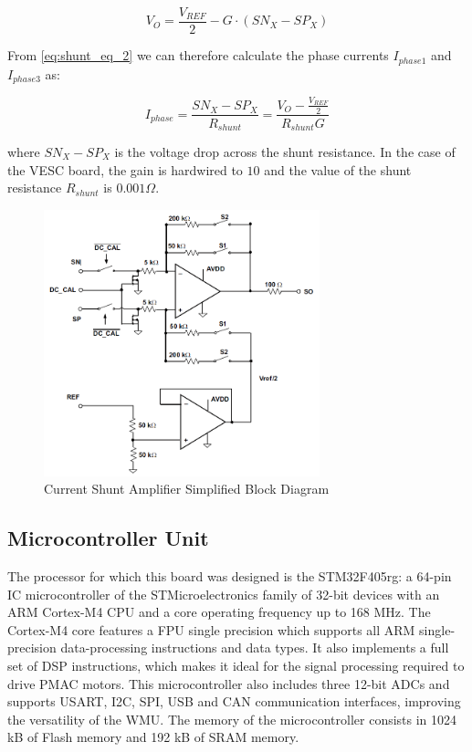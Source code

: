 \begin{equation} \label{eq:shunt_eq_2}
	V_{O} = \frac{V_{REF}}{2} - G \cdot (SN_{X}-SP_{X})
\end{equation}

From \ref{eq:shunt_eq_2} we can therefore calculate the phase currents $I_{phase1}$ and $I_{phase3}$ as:

\begin{equation} \label{eq:shunt_eq_3}
	I_{phase} = \frac{SN_{X}-SP_{X}}{R_{shunt}} = \frac{V_{O}-\frac{V_{REF}}{2}}{R_{shunt} G}
\end{equation}

\noindent
where $SN_{X} - SP_{X}$ is the voltage drop across the shunt resistance. In the case of the VESC board, the gain is hardwired to $10$ and the value of the shunt resistance $R_{shunt}$ is $0.001\Omega$.

\begin{figure}[htbp]
\centering
\includegraphics[width=8cm]{Images/shunt_amp_2.png} 
\caption[Current Shunt Amplifier Simplified Block Diagram]{Current Shunt Amplifier Simplified Block Diagram}
\label{fig:shunt_amp_2}
\end{figure}

\subsection{Microcontroller Unit}

The processor for which this board was designed is the STM32F405rg: a 64-pin \ac{IC} microcontroller of the STMicroelectronics family of 32-bit devices with an ARM Cortex-M4 CPU and a core operating frequency up to 168 MHz. The Cortex-M4 core features a \acf{FPU} single precision which supports all ARM single-precision data-processing instructions and data types. It also implements a full set of \acf{DSP} instructions, which makes it ideal for the signal processing required to drive \ac{PMAC} motors. This microcontroller also includes three 12-bit \ac{ADC}s and supports USART, I2C, SPI, USB and CAN communication interfaces, improving the versatility of the \ac{WMU}. The memory of the microcontroller consists in 1024 kB of Flash memory and 192 kB of SRAM memory.

